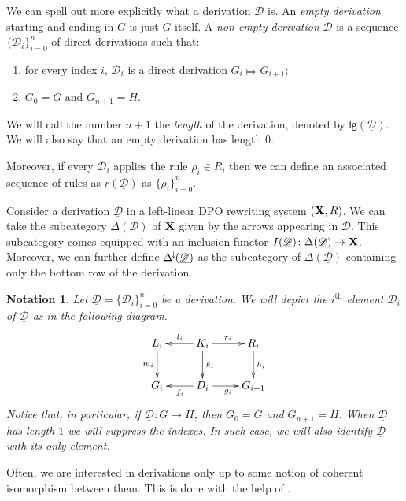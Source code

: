\documentclass[a4paper,UKenglish,cleveref,pdftex, thm-restate,numberwithinsect]{lipics}
\newcommand{\Deltamin}{\Delta^{\hspace{-1pt}\downarrow\hspace{-1pt}}}
\def\R{\mathsf{R}}
\def\X{\textbf {\textup{X}}}
\newcommand{\dder}[1]{\mathscr{#1}}
\newcommand{\der}[1]{\underline{\dder{#1}}}
\newcommand{\lgh}[0]{\mathsf{lg}}
\newtheorem*{notation}{Notation}
\begin{document}
\begin{remark}
We can spell out more explicitly what  a derivation $\dder{D}$ is.  An \emph{empty derivation} starting and ending in $G$ is just $G$ itself.  A \emph{non-empty derivation} $\dder{D}$ is a sequence $\{\dder{D}_i\}_{i=0}^n$ of direct derivations such that:
\begin{enumerate}
	\item for every index $i$, $\dder{D}_i$ is a direct derivation $G_i \Mapsto G_{i+1}$;
	\item $G_0=G$ and $G_{n+1}=H$.
\end{enumerate}

We will call the number $n+1$ the \emph{length} of the derivation, denoted by $\lgh(\der{D})$. We will also say that an empty derivation has length $0$. 

Moreover,  if every $\dder{D}_i$ applies the rule $\rho_i\in R$, then we can define an associated sequence of rules as $r(\der{D})$ as $\{\rho_i\}_{i=0}^n$.
\end{remark}

\begin{remark}\label{rem:func}
	Consider a derivation $\der{D}$ in a left-linear DPO rewriting system $(\X, \R)$. We can take the subcategory $\Delta(\der{D})$ of $\X$ given by the arrows appearing in $\der{D}$. This subcategory comes equipped with an inclusion functor $I(\der{D})\colon \Delta(\der{D})\to \X$. Moreover, we can further define $\Deltamin(\der{D})$ as the subcategory of $\Delta(\der{D})$ containing only the bottom row of the derivation.
\end{remark}
	
\begin{notation}Let $\der{D}=\{\dder{D}_i\}_{i=0}^n$ be a derivation. We will depict the $i^\text{th}$ element $\dder{D}_i$ of $\der{D}$ as in the following diagram.  
	\[\xymatrix{L_i \ar[d]_{m_i}& K_i \ar[d]^{k_i}\ar[l]_{l_i} \ar[r]^{r_i} & R_i \ar[d]^{h_i} \\G_{i} & \ar[l]^{f_{i}} D_{i} \ar[r]_{g_{i}}& G_{i+1} }\]
	Notice that, in particular, if $\der{D}\colon G\to H$, then $G_0=G$ and $G_{n+1}=H$. When $\der{D}$ has length $1$ we will suppress the indexes. In such case, we will also identify $\der{D}$ with its only element. 
\end{notation} 

Often, we are interested in derivations only up to some notion of coherent isomorphism between them. This is done with the help of .
\end{document}
